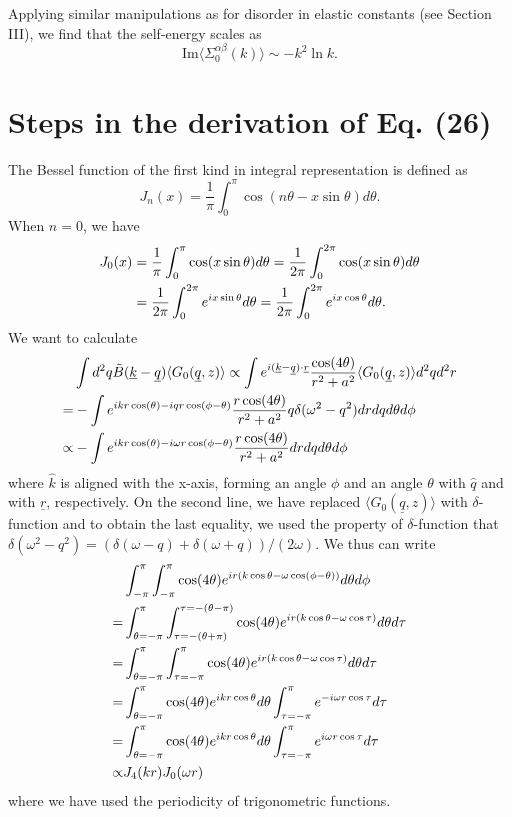 \documentclass[twoside,twocolumn,9pt]{article}
\begin{document}
\begin{appendix}
Applying similar manipulations as for disorder in elastic constants (see Section III), we find that the self-energy scales as
\begin{equation}
\text{Im}\langle\Sigma^{\alpha\beta}_0(k)\rangle\sim-k^2\ln k.
\end{equation}

\section{Steps in the derivation of Eq. (26)}
The Bessel function of the first kind in integral representation is defined as
\begin{equation}
J_n(x)=\frac{1}{\pi}\int_0^\pi\cos(n\theta-x\sin\theta)d\theta.
\end{equation}
When $n=0$, we have
\begin{align}
J_0(x)&=\frac{1}{\pi}\int_0^\pi\cos(x\sin\theta)d\theta=\frac{1}{2\pi}\int_0^{2\pi}\cos(x\sin\theta)d\theta\notag\\
&=\frac{1}{2\pi}\int_0^{2\pi}e^{ix\sin\theta}d\theta=\frac{1}{2\pi}\int_0^{2\pi}e^{ix\cos\theta}d\theta.
\end{align}
We want to calculate
\begin{align}
&\int d^2q\tilde{B}(\underline{k}-\underline{q})\langle G_0(\underline{q},z)\rangle
\propto\int e^{i(\underline{k}-\underline{q})\cdot\underline{r}}\frac{\cos(4\theta)}{r^2+a^2}\langle G_0(\underline{q},z)\rangle d^2qd^2r\notag\\
=&-\int e^{ikr\cos(\theta)-iqr\cos(\phi-\theta)}\frac{r\cos(4\theta)}{r^2+a^2}q\delta(\omega^2-q^2)drdqd\theta d\phi\notag\\
\propto&-\int e^{ikr\cos(\theta)-i\omega r\cos(\phi-\theta)}\frac{r\cos(4\theta)}{r^2+a^2}drdqd\theta d\phi
\end{align}
where $\hat{k}$ is aligned with the x-axis, forming an angle $\phi$ and an angle $\theta$ with $\hat{q}$ and with $\underline{r}$, respectively. On the second line, we have replaced $\langle G_0(\underline{q},z)\rangle$ with $\delta$-function and to obtain the last equality, we used the property of $\delta$-function that $\delta(\omega^2-q^2)=(\delta(\omega-q)+\delta(\omega+q))/(2\omega)$.
We thus can write
\begin{align}
&\int_{-\pi}^\pi\int_{-\pi}^\pi \cos(4\theta)e^{ir(k\cos\theta-\omega\cos(\phi-\theta))}d\theta d\phi\notag\\
=&\int_{\theta=-\pi}^\pi\int_{\tau=-(\theta+\pi)}^{\tau=-(\theta-\pi)}\cos(4\theta)e^{ir(k\cos\theta-\omega\cos\tau)}d\theta d\tau\notag\\
=&\int_{\theta=-\pi}^{\pi}\int_{\tau=-\pi}^\pi \cos(4\theta)e^{ir(k\cos\theta-\omega\cos\tau)}d\theta d\tau\notag\\
=&\int_{\theta=-\pi}^\pi \cos(4\theta)e^{ikr\cos\theta}d\theta\int_{\tau=-\pi}^\pi e^{-i\omega r\cos\tau}d\tau\notag\\
=&\int_{\theta=-\pi}^\pi \cos(4\theta)e^{ikr\cos\theta}d\theta\int_{\tau=-\pi}^\pi e^{i\omega r\cos\tau}d\tau\notag\\
\propto&  J_4(kr)J_0(\omega r)
\end{align}
where we have used the periodicity of trigonometric functions.

\end{appendix}
\end{document}
